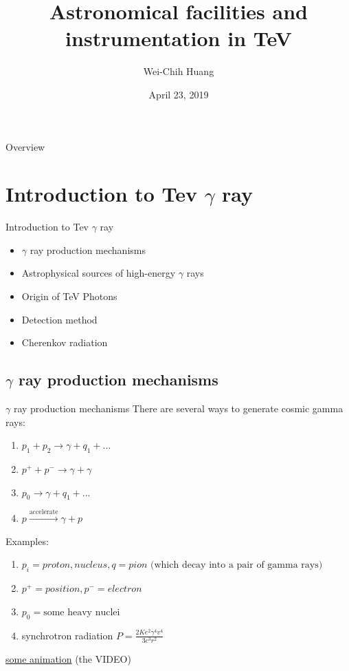 \documentclass{beamer}
\title[TeV Astrophysics]{Astronomical facilities and instrumentation in TeV}
\author{Wei-Chih Huang}
\institute[NTHU]{
National Tsing Hua University \\
\medskip
}
\date{April 23, 2019}
\begin{document}
\begin{frame}
	\titlepage %
\end{frame}

\begin{frame}{Overview}
	\tableofcontents
\end{frame}



\section{Introduction to Tev $\gamma$ ray}
\begin{frame}{Introduction to Tev $\gamma$ ray}
	\begin{itemize}
		\item $\gamma$ ray production mechanisms
		\item Astrophysical sources of high-energy $\gamma$ rays
		\item Origin of TeV Photons
		\item Detection method
		\item Cherenkov radiation
	\end{itemize}
\end{frame}


\subsection{$\gamma$ ray production mechanisms}
\begin{frame}{$\gamma$ ray production mechanisms}
	There are several ways to generate cosmic gamma rays:
	\begin{enumerate}
		\item $p_1 + p_2 \rightarrow \gamma + q_1 + ...$
		\item $p^+ + p^- \rightarrow \gamma + \gamma$
		\item $p_0 \rightarrow \gamma + q_1 + ...$
		\item $p \xrightarrow{\text{accelerate}} \gamma + p$
	\end{enumerate}

	Examples:
	\begin{enumerate}
		\item $p_i = proton, nucleus, q = pion \text{ (which decay into a pair of gamma rays)}$
		\item $p^+ = position, p^- = electron$
		\item $p_0 = \text{some heavy nuclei}$
		\item synchrotron radiation $P = \frac{2Ke^2 \gamma^4 v^4}{3c^3r^2} $
	\end{enumerate}
	\href{https://imagine.gsfc.nasa.gov/science/toolbox/gamma_generation.html}{some animation}
	(the VIDEO)
\end{frame}
\end{document}
